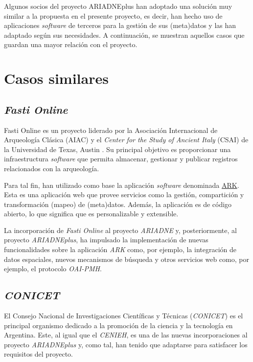 
Algunos socios del proyecto ARIADNEplus han adoptado una solución muy
similar a la propuesta en el presente proyecto, es decir, han hecho uso
de aplicaciones \emph{software} de terceros para la gestión de sus
(meta)datos y las han adaptado según sus necesidades. A continuación, se
muestran aquellos casos que guardan una mayor relación con el proyecto.

\section{Casos similares}

\subsection{\emph{Fasti Online}}

Fasti Online \cite{fasti:web}
es un proyecto liderado por la Asociación Internacional de Arqueología
Clásica (AIAC) \cite{aiac:web} y el \emph{Center
for the Study of Ancient Italy} (CSAI) \cite{csai:web} de la Universidad
de Texas, Austin \cite{uot:web}. Su principal objetivo es proporcionar
una infraestructura \emph{software} que permita almacenar, gestionar y
publicar registros relacionados con la arqueología.

Para tal fin, han utilizado como base la aplicación \emph{software}
denominada \href{https://ark.lparchaeology.com/}{ARK}. Esta es una
aplicación web que provee servicios como la gestión, compartición y
transformación (mapeo) de (meta)datos. Además, la aplicación es de
código abierto, lo que significa que es personalizable y extensible.

La incorporación de \emph{Fasti Online} al proyecto \emph{ARIADNE} y,
posteriormente, al proyecto \emph{ARIADNEplus}, ha impulsado la
implementación de nuevas funcionalidades sobre la aplicación \emph{ARK}
como, por ejemplo, la integración de datos espaciales, nuevos mecanismos
de búsqueda y otros servicios web como, por ejemplo, el protocolo
\emph{OAI-PMH}.

\subsection{\emph{CONICET}}

El Consejo Nacional de Investigaciones Científicas y Técnicas \cite{conicet:web} 
(\emph{CONICET}) es el principal organismo dedicado a la promoción de la ciencia y la
tecnología en Argentina. Este, al igual que el \emph{CENIEH}, es una de las
nuevas incorporaciones al proyecto \emph{ARIADNEplus} y, como tal, han
tenido que adaptarse para satisfacer los requisitos del proyecto.

